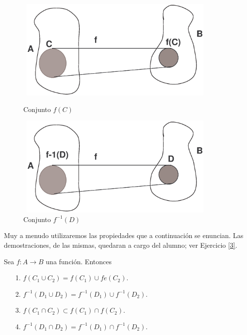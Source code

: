 \begin{figure}[h]

\begin{center}





\includegraphics[height=5cm, width=10cm]{funcima.eps}


 \caption{Conjunto $f(C)$}\label{figura1}





\includegraphics[height=5cm, width=10cm]{fpreima.eps}


 \caption{Conjunto $f^{-1}(D)$}\label{figura2}


\end{center}

\end{figure}





Muy a menudo utilizaremos las propiedades que a continuaci\'on se
enuncian. Las demostraciones, de las mismas, quedaran a cargo del
alumno; ver Ejercicio \vref{3}.

\begin{proposicion}\label{propfunc} Sea $f:A\longrightarrow B$ una funci\'on.
Entonces
\begin{itemize}
\item[1.] $f(C_1\cup C_2)=f(C_1)\cup fe(C_2).$
\item[2.]$f^{-1}(D_1\cup D_2)= f^{-1}(D_1)\cup f^{-1}(D_2).$
\item[3.] $f(C_1\cap C_2)\subset f(C_1)\cap f(C_2).$
\item[4.]$f^{-1}(D_1\cap D_2)= f^{-1}(D_1)\cap f^{-1}(D_2).$
\end{itemize}
\end{proposicion}


